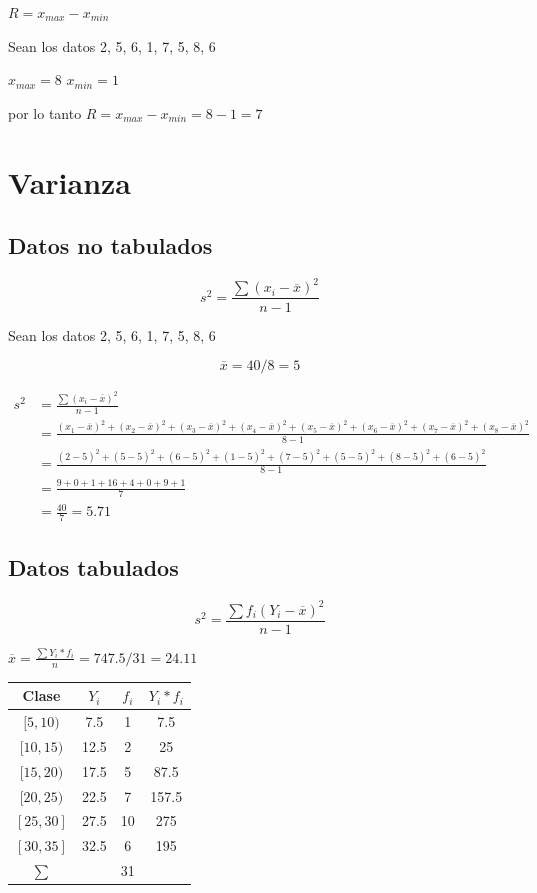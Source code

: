 \documentclass[10pt,]{krantz}
\theoremstyle{definition}
\theoremstyle{definition}
\theoremstyle{definition}
\theoremstyle{definition}
\theoremstyle{remark}
\begin{document}
\(R=x_{max}-x_{min}\)

Sean los datos 2, 5, 6, 1, 7, 5, 8, 6

\(x_{max}=8\)
\(x_{min}=1\)

por lo tanto \(R=x_{max}-x_{min}=8-1=7\)

\hypertarget{varianza}{%
\section{Varianza}\label{varianza}}

\hypertarget{datos-no-tabulados}{%
\subsection{Datos no tabulados}\label{datos-no-tabulados}}

\[s^2=\frac{\sum\left(x_i-\overline{x}\right )^2}{n-1}\]

Sean los datos 2, 5, 6, 1, 7, 5, 8, 6

\[\overline{x}=40/8=5\]

\[
\begin{aligned}
s^2&=\frac{\sum\left(x_i-\overline{x}\right )^2}{n-1}\\
&=\frac{\left(x_1-\overline{x}\right )^2+\left(x_2-\overline{x}\right )^2+\left(x_3-\overline{x}\right )^2+\left(x_4-\overline{x}\right )^2+\left(x_5-\overline{x}\right )^2+\left(x_6-\overline{x}\right )^2+\left(x_7-\overline{x}\right )^2+\left(x_8-\overline{x}\right )^2}{8-1}\\
&=\frac{\left(2-5\right )^2+\left(5-5\right )^2+\left(6-5\right )^2+\left(1-5\right )^2+\left(7-5\right )^2+\left(5-5\right )^2+\left(8-5\right )^2+\left(6-5\right )^2}{8-1}\\
&=\frac{9+0+1+16+4+0+9+1}{7}\\
&=\frac{40}{7}=5.71
\end{aligned}
\]

\hypertarget{datos-tabulados}{%
\subsection{Datos tabulados}\label{datos-tabulados}}

\[s^2=\frac{\sum f_i\left(Y_i-\overline{x}\right )^2}{n-1}\]

\(\overline{x}=\frac{\sum Y_i*f_i}{n}=747.5/31=24.11\)

\begin{longtable}[]{@{}cccc@{}}
\toprule
Clase & \(Y_i\) & \(f_i\) & \(Y_i*f_i\)\tabularnewline
\midrule
\endhead
\([5,10)\) & 7.5 & 1 & 7.5\tabularnewline
\([10,15)\) & 12.5 & 2 & 25\tabularnewline
\([15,20)\) & 17.5 & 5 & 87.5\tabularnewline
\([20,25)\) & 22.5 & 7 & 157.5\tabularnewline
\([25,30]\) & 27.5 & 10 & 275\tabularnewline
\([30,35]\) & 32.5 & 6 & 195\tabularnewline
\(\sum\) & & 31 &\tabularnewline
\bottomrule
\end{longtable}
\end{document}
